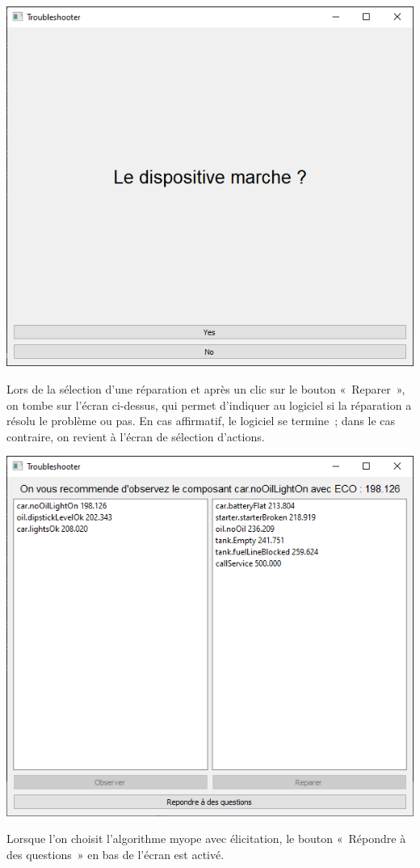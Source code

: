 \documentclass[a4paper,11pt]{article}
\theoremstyle{plain}
\theoremstyle{definition}
\begin{document}
\begin{center}
\includegraphics[scale=0.667]{Figures/reparacao}
\end{center}
Lors de la sélection d'une réparation et après un clic sur le bouton «~Reparer~», on tombe sur l'écran ci-dessus, qui permet d'indiquer au logiciel si la réparation a résolu le problème ou pas. En cas affirmatif, le logiciel se termine~; dans le cas contraire, on revient à l'écran de sélection d'actions.

\begin{center}
\includegraphics[scale=0.667]{Figures/elicitacao1}
\end{center}
Lorsque l'on choisit l'algorithme myope avec élicitation, le bouton «~Répondre à des questions~» en bas de l'écran est activé.
\end{document}
